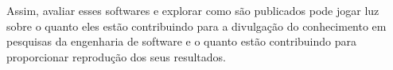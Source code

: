 %
%
%
%
%
%
%
%
%
%
%
%
%
%
%
%

Assim, avaliar esses softwares e explorar como são publicados pode jogar luz
sobre o quanto eles estão contribuindo para a divulgação do conhecimento em
pesquisas da engenharia de software e o quanto estão contribuindo para
proporcionar reprodução dos seus resultados.

